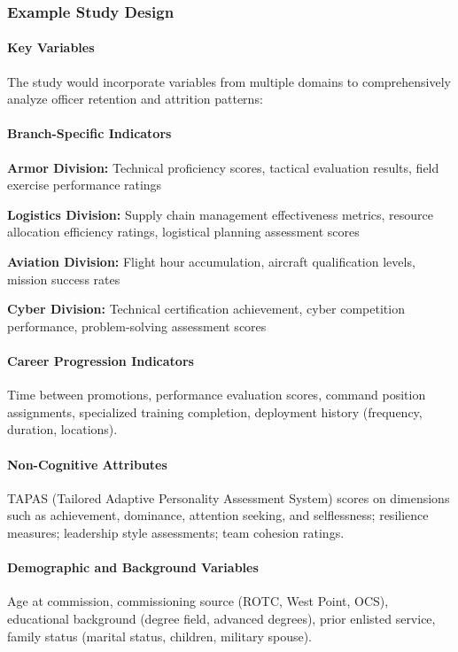 \documentclass[../main.tex]{subfiles}
\begin{document}
\subsubsection{Example Study Design}


\paragraph{Key Variables}

The study would incorporate variables from multiple domains to comprehensively analyze officer retention and attrition patterns:

\paragraph{Branch-Specific Indicators}
\textbf{Armor Division:} Technical proficiency scores, tactical evaluation results, field exercise performance ratings

\textbf{Logistics Division:} Supply chain management effectiveness metrics, resource allocation efficiency ratings, logistical planning assessment scores

\textbf{Aviation Division:} Flight hour accumulation, aircraft qualification levels, mission success rates

\textbf{Cyber Division:} Technical certification achievement, cyber competition performance, problem-solving assessment scores

\paragraph{Career Progression Indicators}
Time between promotions, performance evaluation scores, command position assignments, specialized training completion, deployment history (frequency, duration, locations).

\paragraph{Non-Cognitive Attributes}
TAPAS (Tailored Adaptive Personality Assessment System) scores on dimensions such as achievement, dominance, attention seeking, and selflessness; resilience measures; leadership style assessments; team cohesion ratings.

\paragraph{Demographic and Background Variables}
Age at commission, commissioning source (ROTC, West Point, OCS), educational background (degree field, advanced degrees), prior enlisted service, family status (marital status, children, military spouse).
\end{document}
